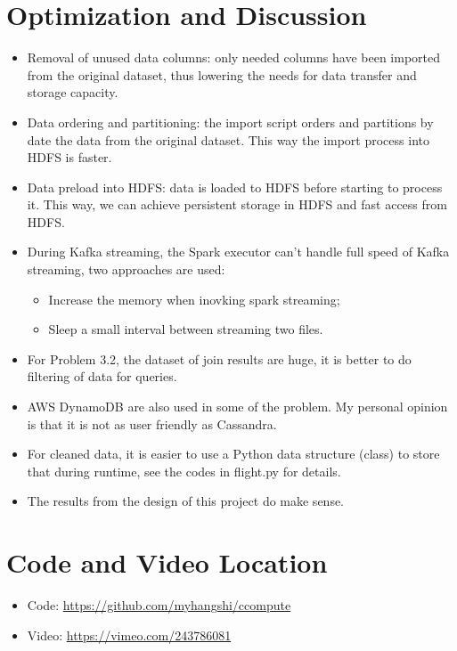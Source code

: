 \documentclass[fontsize=11pt,paper=a4]{scrartcl}
\begin{document}
\section{Optimization and Discussion}
\begin{itemize}
\item Removal of unused data columns: only needed columns have been imported from the original dataset, thus lowering the needs for data transfer and storage capacity.
\item Data ordering and partitioning: the import script orders and partitions by date the data from the original dataset. This way the import process into HDFS is faster.
\item Data preload into HDFS: data  is loaded to HDFS before starting to process it. This way, we can achieve persistent storage in HDFS and fast access from HDFS.
\item During Kafka streaming, the Spark executor can't handle full speed of Kafka streaming, two approaches are used: 
\begin{itemize}
\item Increase the memory when inovking spark streaming; 
\item Sleep a small interval between streaming two files. 
\end{itemize} 
\item For Problem 3.2, the dataset of join results are huge, it is better to do filtering of data for queries. 
\item AWS DynamoDB are also used in some of the problem. My personal opinion is that it is not as user friendly as Cassandra. 
\item For cleaned data, it is easier to use a Python data structure (class) to store that during runtime, see the codes in flight.py for details. 
\item The results from the design of this project do make sense. 
\end{itemize} 
 
\section{Code and Video Location}
\begin{itemize}
\item Code:    \url{https://github.com/myhangshi/ccompute}
\item Video:   \url{https://vimeo.com/243786081}
\end{itemize} 
\end{document}
